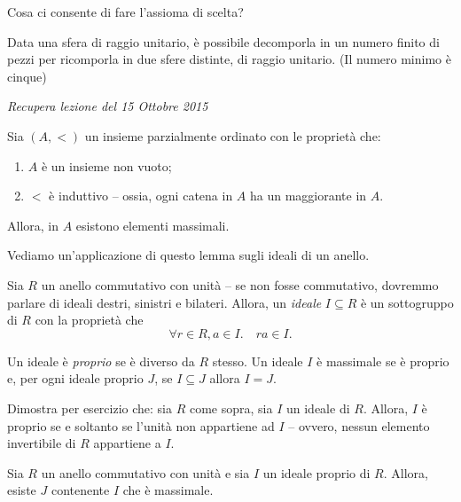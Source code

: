 Cosa ci consente di fare l'assioma di scelta?

\begin{thm}
  Data una sfera di raggio unitario, è possibile decomporla in un numero finito di pezzi per ricomporla in due sfere distinte, di raggio unitario. (Il numero minimo è cinque)
\end{thm}

\emph{Recupera lezione del 15 Ottobre 2015}

\begin{lem}
  Sia \((A, <)\) un insieme parzialmente ordinato con le proprietà che:
  \begin{enumerate}
    \item \label{zorn:1}\(A\) è un insieme non vuoto;
    \item \label{zorn:2}\(<\) è induttivo -- ossia, ogni catena in \(A\) ha un maggiorante in \(A\).
  \end{enumerate}
  Allora, in \(A\) esistono elementi massimali.
\end{lem}

Vediamo un'applicazione di questo lemma sugli ideali di un anello.

\begin{dfn}
  Sia \(R\) un anello commutativo con unità -- se non fosse commutativo, dovremmo parlare di ideali destri, sinistri e bilateri. Allora, un \emph{ideale} \(I \subseteq R\) è un sottogruppo di \(R\) con la proprietà che
  \begin{equation}
    \forall r \in R, a \in I.\quad ra \in I. \label{ide:1}
  \end{equation}
\end{dfn}

\begin{dfn}
  Un ideale è \emph{proprio} se è diverso da \(R\) stesso. Un ideale \(I\) è massimale se è proprio e, per ogni ideale proprio \(J\), se \(I \subseteq J\) allora \(I = J\).
\end{dfn}

Dimostra per esercizio che: sia \(R\) come sopra, sia \(I\) un ideale di \(R\). Allora, \(I\) è proprio se e soltanto se l'unità non appartiene ad \(I\) -- ovvero, nessun elemento invertibile di \(R\) appartiene a \(I\).

\begin{thm}
  Sia \(R\) un anello commutativo con unità e sia \(I\) un ideale proprio di \(R\). Allora, esiste \(J\) contenente \(I\) che è massimale.
\end{thm}


